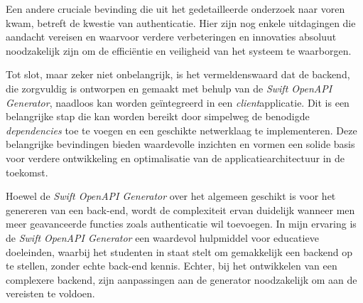 Een andere cruciale bevinding die uit het gedetailleerde onderzoek naar voren kwam, betreft de kwestie van authenticatie. Hier zijn nog enkele uitdagingen die aandacht vereisen en waarvoor verdere verbeteringen en innovaties absoluut noodzakelijk zijn om de efficiëntie en veiligheid van het systeem te waarborgen.

Tot slot, maar zeker niet onbelangrijk, is het vermeldenswaard dat de backend, die zorgvuldig is ontworpen en gemaakt met behulp van de \textit{Swift OpenAPI Generator}, naadloos kan worden geïntegreerd in een \textit{client}applicatie. Dit is een belangrijke stap die kan worden bereikt door simpelweg de benodigde \textit{dependencies} toe te voegen en een geschikte netwerklaag te implementeren. Deze belangrijke bevindingen bieden waardevolle inzichten en vormen een solide basis voor verdere ontwikkeling en optimalisatie van de applicatiearchitectuur in de toekomst.

Hoewel de \textit{Swift OpenAPI Generator} over het algemeen geschikt is voor het genereren van een back-end, wordt de complexiteit ervan duidelijk wanneer men meer geavanceerde functies zoals authenticatie wil toevoegen. In mijn ervaring is de \textit{Swift OpenAPI Generator} een waardevol hulpmiddel voor educatieve doeleinden, waarbij het studenten in staat stelt om gemakkelijk een backend op te stellen, zonder echte back-end kennis. Echter, bij het ontwikkelen van een complexere backend, zijn aanpassingen aan de generator noodzakelijk om aan de vereisten te voldoen.
